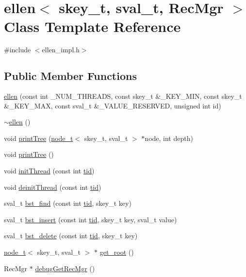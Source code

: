 \hypertarget{classellen}{}\section{ellen$<$ skey\+\_\+t, sval\+\_\+t, Rec\+Mgr $>$ Class Template Reference}
\label{classellen}


{\ttfamily \#include $<$ellen\+\_\+impl.\+h$>$}

\subsection*{Public Member Functions}
\begin{DoxyCompactItemize}
\item 
\hyperlink{classellen_ad1cfcde41101b3a54020262f0993417a}{ellen} (const int \+\_\+\+N\+U\+M\+\_\+\+T\+H\+R\+E\+A\+DS, const skey\+\_\+t \&\+\_\+\+K\+E\+Y\+\_\+\+M\+IN, const skey\+\_\+t \&\+\_\+\+K\+E\+Y\+\_\+\+M\+AX, const sval\+\_\+t \&\+\_\+\+V\+A\+L\+U\+E\+\_\+\+R\+E\+S\+E\+R\+V\+ED, unsigned int id)
\item 
\hyperlink{classellen_a466b2bb9d24a652eafb8d38ecfe41a2c}{$\sim$ellen} ()
\item 
void \hyperlink{classellen_aa3a69ee3923a54a50d423f670054ac25}{print\+Tree} (\hyperlink{structnode__t}{node\+\_\+t}$<$ skey\+\_\+t, sval\+\_\+t $>$ $\ast$node, int depth)
\item 
void \hyperlink{classellen_ae941b46c05563895737175b543633202}{print\+Tree} ()
\item 
void \hyperlink{classellen_a5a9378e1af473ce6080251945409d95e}{init\+Thread} (const int \hyperlink{microbench_2main_8cpp_a9ca9869868fe7e7a38a921cc7de4103f}{tid})
\item 
void \hyperlink{classellen_a9a24b5c1718973cb84ed1dfde8001133}{deinit\+Thread} (const int \hyperlink{microbench_2main_8cpp_a9ca9869868fe7e7a38a921cc7de4103f}{tid})
\item 
sval\+\_\+t \hyperlink{classellen_a129a7e46ca479682828ef6de7ae6b54f}{bst\+\_\+find} (const int \hyperlink{microbench_2main_8cpp_a9ca9869868fe7e7a38a921cc7de4103f}{tid}, skey\+\_\+t key)
\item 
sval\+\_\+t \hyperlink{classellen_a45033b3247efaf96946bbdd0583d9fe2}{bst\+\_\+insert} (const int \hyperlink{microbench_2main_8cpp_a9ca9869868fe7e7a38a921cc7de4103f}{tid}, skey\+\_\+t key, sval\+\_\+t value)
\item 
sval\+\_\+t \hyperlink{classellen_adc627624680a78fd4ad3838ce8ec2b98}{bst\+\_\+delete} (const int \hyperlink{microbench_2main_8cpp_a9ca9869868fe7e7a38a921cc7de4103f}{tid}, skey\+\_\+t key)
\item 
\hyperlink{structnode__t}{node\+\_\+t}$<$ skey\+\_\+t, sval\+\_\+t $>$ $\ast$ \hyperlink{classellen_addc23c69e65df78a07072c1a2cf73840}{get\+\_\+root} ()
\item 
Rec\+Mgr $\ast$ \hyperlink{classellen_a122174abdfec87e248ead195e6da56d1}{debug\+Get\+Rec\+Mgr} ()
\end{DoxyCompactItemize}


